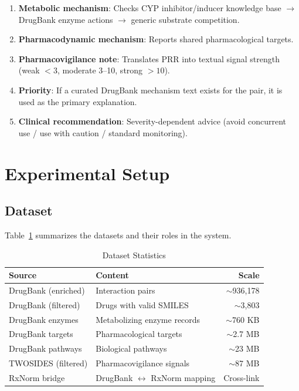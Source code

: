 \documentclass[conference]{IEEEtran}
\begin{document}
\begin{enumerate}
    \item \textbf{Metabolic mechanism}: Checks CYP inhibitor/inducer knowledge base $\rightarrow$ DrugBank enzyme actions $\rightarrow$ generic substrate competition.
    \item \textbf{Pharmacodynamic mechanism}: Reports shared pharmacological targets.
    \item \textbf{Pharmacovigilance note}: Translates PRR into textual signal strength (weak $<3$, moderate 3--10, strong $>10$).
    \item \textbf{Priority}: If a curated DrugBank mechanism text exists for the pair, it is used as the primary explanation.
    \item \textbf{Clinical recommendation}: Severity-dependent advice (avoid concurrent use / use with caution / standard monitoring).
\end{enumerate}

\section{Experimental Setup}

\subsection{Dataset}
Table~\ref{tab:dataset} summarizes the datasets and their roles in the system.

\begin{table}[htbp]
\caption{Dataset Statistics}
\label{tab:dataset}
\centering
\begin{tabular}{@{}llr@{}}
\toprule
\textbf{Source} & \textbf{Content} & \textbf{Scale} \\
\midrule
DrugBank (enriched)     & Interaction pairs           & $\sim$936,178 \\
DrugBank (filtered)     & Drugs with valid SMILES     & $\sim$3,803 \\
DrugBank enzymes        & Metabolizing enzyme records  & $\sim$760 KB \\
DrugBank targets        & Pharmacological targets      & $\sim$2.7 MB \\
DrugBank pathways       & Biological pathways          & $\sim$23 MB \\
TWOSIDES (filtered)     & Pharmacovigilance signals    & $\sim$87 MB \\
RxNorm bridge           & DrugBank $\leftrightarrow$ RxNorm mapping & Cross-link \\
\bottomrule
\end{tabular}
\end{table}
\end{document}
